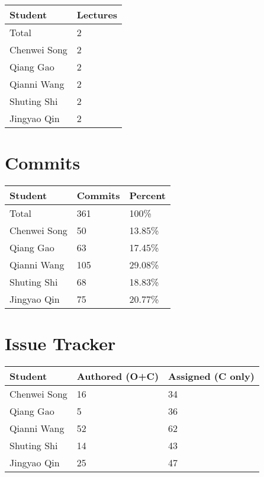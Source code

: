 \documentclass{article}
\begin{document}
\begin{table}[H]
\centering
\begin{tabular}{ll}
\toprule
\textbf{Student} & \textbf{Lectures}\\
\midrule
Total & 2\\
Chenwei Song & 2\\
Qiang Gao & 2\\
Qianni Wang & 2\\
Shuting Shi & 2\\
Jingyao Qin & 2\\
\bottomrule
\end{tabular}
\end{table}


\section{Commits}

\begin{table}[H]
\centering
\begin{tabular}{lll}
\toprule
\textbf{Student} & \textbf{Commits} & \textbf{Percent}\\
\midrule
Total & 361 & 100\% \\
Chenwei Song & 50 & 13.85\%\\
Qiang Gao & 63 & 17.45\%\\
Qianni Wang & 105 & 29.08\%\\
Shuting Shi & 68 & 18.83\%\\
Jingyao Qin & 75 & 20.77\%\\
\bottomrule
\end{tabular}
\end{table}

\section{Issue Tracker}


\begin{table}[H]
\centering
\begin{tabular}{lll}
\toprule
\textbf{Student} & \textbf{Authored (O+C)} & \textbf{Assigned (C only)}\\
\midrule
Chenwei Song & 16 & 34 \\
Qiang Gao & 5 & 36 \\
Qianni Wang & 52 & 62 \\
Shuting Shi & 14 & 43 \\
Jingyao Qin & 25 & 47 \\
\bottomrule
\end{tabular}
\end{table}
\end{document}
